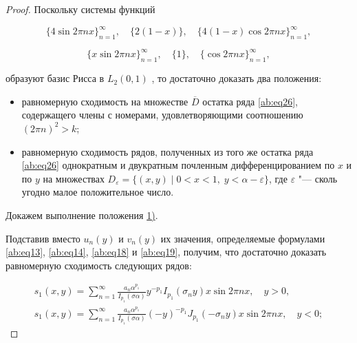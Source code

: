 \begin{proof}

Поскольку системы функций

$$

\{4\sin 2\pi nx\}_{n=1}^{\infty},\quad \{2(1-x)\},\quad \{4(1-x)\cos 2\pi nx\}_{n=1}^{\infty},

$$

$$

\{x\sin 2\pi nx\}_{n=1}^{\infty},\quad \{1\},\quad \{\cos 2\pi nx\}_{n=1}^{\infty},

$$

образуют базис Рисса в $L_{2}(0, 1)$ \cite{ab:bib:Moiseev2}, то достаточно доказать два положения:



\hypertarget{ab:1}{}

\begin{itemize}

\item [1)] равномерную сходимость на множестве $\overline{D}$ остатка ряда \eqref{ab:eq26}, содержащего члены с номерами, удовлетворяющими соотношению \hypertarget{ab:2}{} $(2\pi n)^2>k$; 



\item [2)] равномерную сходимость рядов, полученных из того же остатка ряда \eqref{ab:eq26} однократным и двукратным почленным дифференцированием по $x$ и по $y$ на множествах $D_{\varepsilon}=\{(x,y)\mid 0<x<1, \; y<\alpha-\varepsilon\}$, где $\varepsilon$ "--- сколь угодно малое положительное число.



\end{itemize}



Докажем выполнение положения \hyperlink{ab:1}{1)}.

Подставив вместо $u_n(y)$ и $v_n(y)$ их значения, определяемые формулами \eqref{ab:eq13}, \eqref{ab:eq14}, \eqref{ab:eq18} и \eqref{ab:eq19}, получим, что достаточно доказать равномерную сходимость следующих рядов:

\begin{gather}

s_1(x,y)=\sum\limits_{n=1}^{\infty}\frac{a_n\alpha^{p_1}}{I_{p_1}(\sigma\alpha)}y^{-p_1}I_{p_1}(\sigma_ny)x\sin2\pi nx,\quad y>0,

\\

s_1(x,y)=\sum\limits_{n=1}^{\infty}\frac{a_n\alpha^{p_1}}{I_{p_1}(\sigma\alpha)}(-y)^{-p_1}J_{p_1}(-\sigma_ny)x\sin2\pi nx,\quad y<0;


\end{gather}
\end{proof}
